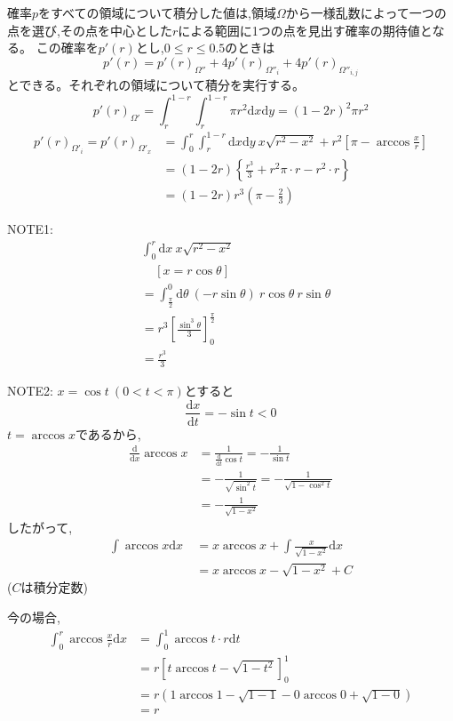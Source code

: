 確率$p$をすべての領域について積分した値は,領域$\Omega$から一様乱数によって一つの点を選び,その点を中心とした$r$による範囲に1つの点を見出す確率の期待値となる。
この確率を$p'(r)$とし,$0\le r \le 0.5$のときは
\[p'(r) = p'(r)_{\Omega''} + 4p'(r)_{\Omega''_{i}} + 4p'(r)_{\Omega''_{i,j}}\]
とできる。それぞれの領域について積分を実行する。
\[p'(r)_{\Omega'} = \int_{r}^{1-r} \int_{r}^{1-r}\pi r^{2}\mathrm{d}x\mathrm{d}y = (1-2r)^{2}\pi r^{2}\]
\begin{align}
p'(r)_{\Omega'_{i}} = p'(r)_{\Omega'_{x}} &= \int_{0}^{r} \int_{r}^{1-r}\mathrm{d}x\mathrm{d}y\ x\sqrt{r^{2}-x^{2}} + r^{2}\left[\pi - \arccos\frac{x}{r}\right]\nonumber \\
&= (1-2r)\left\{ \frac{r^{3}}{3} + r^{2}\pi\cdot r - r^{2}\cdot r \right\}\nonumber \\
&= (1-2r)r^{3}\left( \pi-\frac{2}{3} \right)
\end{align}

NOTE1:
\begin{align}
&\int_{0}^{r}\mathrm{d}x\ x\sqrt{r^{2}-x^{2}} \nonumber \\
&\ \ \ \ \ \left[x = r\cos \theta \right]\nonumber \\
&= \int_{\frac{\pi}{2}}^{0}\mathrm{d}\theta\ (-r\sin\theta)\ r\cos\theta\ r\sin\theta\nonumber \\
&= r^{3}\left[ \frac{\sin^{3}\theta}{3}\right]^{\frac{\pi}{2}}_{0} \nonumber \\
&= \frac{r^{3}}{3}
\end{align}

NOTE2:
$x = \cos t \ (0< t< \pi)$とすると
\[\frac{\mathrm{d}x}{\mathrm{d}t} = - \sin t < 0\]
$t = \arccos x$であるから,
\begin{align}
\frac{\mathrm{d}}{\mathrm{d}x}\arccos x &= \frac{1}{\frac{\mathrm{d}}{\mathrm{d}t}\cos t} = -\frac{1}{\sin t}\nonumber \\
&=- \frac{1}{\sqrt{\sin^{2}t}} = - \frac{1}{\sqrt{1- \cos^{2}t}} \nonumber \\
&= - \frac{1}{\sqrt{1- x^{2}}}
\end{align}
したがって,
\begin{align}
\int \arccos x \mathrm{d}x\  &= x\arccos x + \int \frac{x}{\sqrt{1-x^{2}}}\mathrm{d}x\nonumber \\
&=x\arccos x - \sqrt{1-x^{2}} + C
\end{align}
($C$は積分定数)

今の場合,
\begin{align}
\int^{r}_{0} \arccos \frac{x}{r} \mathrm{d}x &= \int^{1}_{0}\arccos t \cdot r\mathrm{d}t\nonumber \\
&= r \left[ t \arccos t - \sqrt{1-t^{2}} \right]^{1}_{0}\nonumber \\
&= r ( 1\arccos1 -\sqrt{1-1} - 0 \arccos0 + \sqrt{1-0})\nonumber \\
&= r
\end{align}

